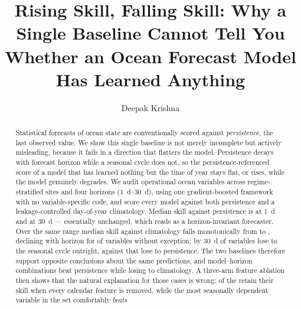 \documentclass[runningheads]{llncs}
\begin{document}
\title{Rising Skill, Falling Skill: Why a Single Baseline Cannot Tell You
Whether an Ocean Forecast Model Has Learned Anything}


\author{Deepak Krishna}

\maketitle

\begin{abstract}
Statistical forecasts of ocean state are conventionally scored against
\emph{persistence}, the last observed value. We show this single baseline is
not merely incomplete but actively misleading, because it fails in a direction
that flatters the model. Persistence decays with forecast horizon while a
seasonal cycle does not, so the persistence-referenced score of a model that
has learned nothing but the time of year stays flat, or rises, while the model
genuinely degrades. We audit \NVars{} operational ocean variables across
\NSites{} regime-stratified sites and four horizons
(\SIrange{1}{30}{\day}), using one gradient-boosted framework with no
variable-specific code, and score every model against both persistence and a
leakage-controlled day-of-year climatology. Median skill against persistence is
\MedSkillPOne{} at \SI{1}{\day} and \MedSkillPThirty{} at \SI{30}{\day}
--- essentially unchanged, which reads as a horizon-invariant forecaster. Over
the same range median skill against climatology falls monotonically from
\MedSkillCOne{} to \MedSkillCThirty{}, declining with horizon for
\NFallingClim{} of \NVars{} variables without exception; by \SI{30}{\day}
\NLoseClimThirty{} of \NVars{} variables lose to the seasonal cycle outright,
against \NLosePersThirty{} that lose to persistence. The two baselines
therefore support opposite conclusions about the same predictions, and
\NLoseToClim{} model--horizon combinations beat persistence while losing to
climatology. A three-arm feature ablation then shows that the natural
explanation for those cases is wrong: \NFlatteredNonSeasonal{} of the
\NFlattered{} retain their skill when every calendar feature is removed, while
the most seasonally dependent variable in the set comfortably \emph{beats}

\end{abstract}
\end{document}
